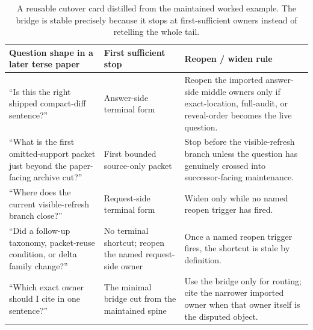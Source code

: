 \documentclass[11pt]{article}
\begin{document}
\begin{table}[t]
\centering
\small
\begin{tabularx}{\linewidth}{@{}L M Y@{}}
\toprule
Question shape in a later terse paper & First sufficient stop & Reopen / widen rule \\
\midrule
``Is this the right shipped compact-diff sentence?'' & Answer-side terminal form & Reopen the imported answer-side middle owners only if exact-location, full-audit, or reveal-order becomes the live question. \\
``What is the first omitted-support packet just beyond the paper-facing archive cut?'' & First bounded source-only packet & Stop before the visible-refresh branch unless the question has genuinely crossed into successor-facing maintenance. \\
``Where does the current visible-refresh branch close?'' & Request-side terminal form & Widen only while no named reopen trigger has fired. \\
``Did a follow-up taxonomy, packet-reuse condition, or delta family change?'' & No terminal shortcut; reopen the named request-side owner & Once a named reopen trigger fires, the shortcut is stale by definition. \\
``Which exact owner should I cite in one sentence?'' & The minimal bridge cut from the maintained spine & Use the bridge only for routing; cite the narrower imported owner when that owner itself is the disputed object. \\
\bottomrule
\end{tabularx}
\caption{A reusable cutover card distilled from the maintained worked example. The bridge is stable precisely because it stops at first-sufficient owners instead of retelling the whole tail.}
\label{tab:spine-cutover-card}
\end{table}
\end{document}
